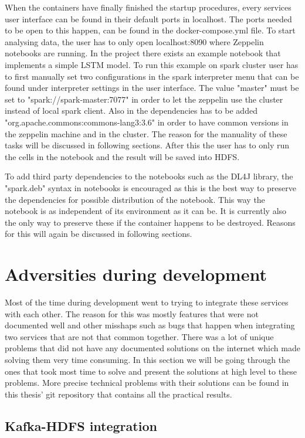 When the containers have finally finished the startup procedures, every services user interface can be found in their default ports in localhost.
The ports needed to be open to this happen, can be found in the docker-compose.yml file.
To start analysing data, the user has to only open localhost:8090 where Zeppelin notebooks are running.
In the project there exists an example notebook that implements a simple LSTM model.
To run this example on spark cluster user has to first manually set two configurations in the spark interpreter menu that can be found under interpreter settings in the user interface.
The value "master" must be set to "spark://spark-master:7077" in order to let the zeppelin use the cluster instead of local spark client.
Also in the dependencies has to be added "org.apache.commons:commons-lang3:3.6" in order to have common versions in the zeppelin machine and in the cluster.
The reason for the manuality of these tasks will be discussed in following sections.
After this the user has to only run the cells in the notebook and the result will be saved into HDFS.

To add third party dependencies to the notebooks such as the DL4J library, the "spark.deb" syntax in notebooks is encouraged as this is the best way to preserve the dependencies for possible distribution of the notebook.
This way the notebook is as independent of its environment as it can be.
It is currently also the only way to preserve these if the container happens to be destroyed. 
Reasons for this will again be discussed in following sections.

\section{Adversities during development}

Most of the time during development went to trying to integrate these services with each other.
The reason for this was mostly features that were not documented well and other misshaps such as bugs that happen when integrating two services that are not that common together.
There was a lot of unique problems that did not have any documented solutions on the internet which made solving them very time consuming.
In this section we will be going through the ones that took most time to solve and present the solutions at high level to these problems.
More precise technical problems with their solutions can be found in this thesis' git repository that contains all the practical results.

\subsection{Kafka-HDFS integration}

